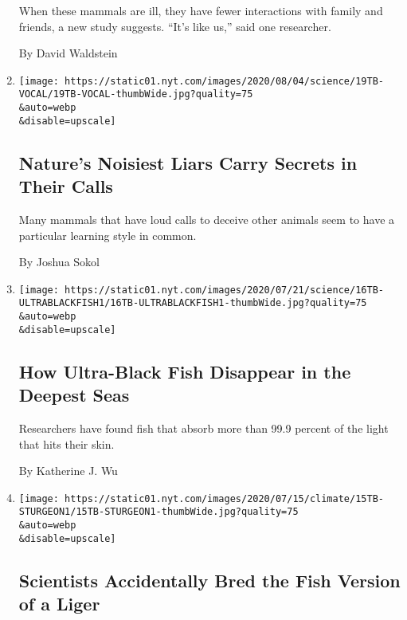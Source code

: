 \begin{enumerate}
  When these mammals are ill, they have fewer interactions with family
  and friends, a new study suggests. ``It's like us,'' said one
  researcher.

  By David Waldstein
\item
  \href{/2020/07/21/science/mammals-vocal-learning.html}{}

  \texttt{[image: https://static01.nyt.com/images/2020/08/04/science/19TB-VOCAL/19TB-VOCAL-thumbWide.jpg?quality=75\\\&auto=webp\\\&disable=upscale]}

  \hypertarget{natures-noisiest-liars-carry-secrets-in-their-calls}{%
  \subsection{Nature's Noisiest Liars Carry Secrets in Their
  Calls}\label{natures-noisiest-liars-carry-secrets-in-their-calls}}

  Many mammals that have loud calls to deceive other animals seem to
  have a particular learning style in common.

  By Joshua Sokol
\item
  \href{/2020/07/16/science/ultra-black-fish.html}{}

  \texttt{[image: https://static01.nyt.com/images/2020/07/21/science/16TB-ULTRABLACKFISH1/16TB-ULTRABLACKFISH1-thumbWide.jpg?quality=75\\\&auto=webp\\\&disable=upscale]}

  \hypertarget{how-ultra-black-fish-disappear-in-the-deepest-seas}{%
  \subsection{How Ultra-Black Fish Disappear in the Deepest
  Seas}\label{how-ultra-black-fish-disappear-in-the-deepest-seas}}

  Researchers have found fish that absorb more than 99.9 percent of the
  light that hits their skin.

  By Katherine J. Wu
\item
  \href{/2020/07/15/science/hybrid-sturgeon-paddlefish.html}{}

  \texttt{[image: https://static01.nyt.com/images/2020/07/15/climate/15TB-STURGEON1/15TB-STURGEON1-thumbWide.jpg?quality=75\\\&auto=webp\\\&disable=upscale]}

  \hypertarget{scientists-accidentally-bred-the-fish-version-of-a-liger}{%
  \subsection{Scientists Accidentally Bred the Fish Version of a
  Liger}\label{scientists-accidentally-bred-the-fish-version-of-a-liger}}


\end{enumerate}
